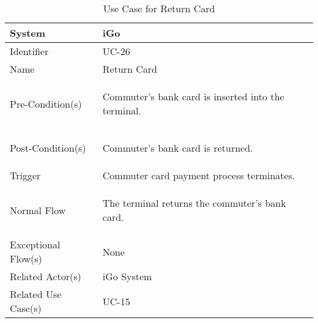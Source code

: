 \begin{table}[ht]
    \centering
    \begin{tabular}{|l|p{11cm}|}
        \hline
        System             & iGo\\
        \hline
        Identifier         & UC-26 \\
        \hline
        Name               & Return Card \\
        \hline
        Pre-Condition(s)   & 
        \begin{enumerate*}[itemjoin=\newline]
            \item Commuter's bank card is inserted into the terminal.
        \end{enumerate*} \\
        \hline
        Post-Condition(s)  & 
        \begin{enumerate*}[itemjoin=\newline]
            \item Commuter's bank card is returned.
        \end{enumerate*} \\
        \hline
        Trigger            & Commuter card payment process terminates. \\
        \hline
        Normal Flow        & 
        \begin{enumerate*}[itemjoin=\newline]
            \item The terminal returns the commuter's bank card.
        \end{enumerate*} \\
        \hline
        Exceptional Flow(s)& None \\
        \hline
        Related Actor(s)   & iGo System \\
        \hline
        Related Use Case(s)& UC-15\\
        \hline
    \end{tabular}
    \caption{Use Case for Return Card}
    \label{tab:UC_ReturnCard}
\end{table}
